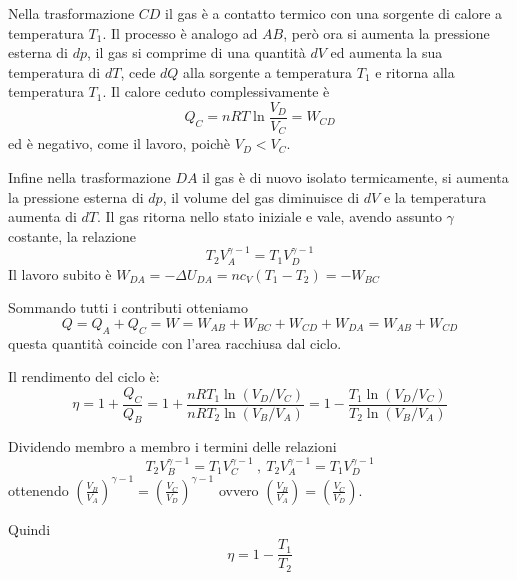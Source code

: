 \documentclass[class=book, crop=false, oneside, 12pt]{standalone}
\begin{document}
Nella trasformazione \(C D\) il gas è a contatto termico con una sorgente di calore a temperatura \(T_1\). 
Il processo è analogo ad \(A B\), però ora si aumenta la pressione esterna di \(d p\), il gas si comprime di una quantità \(d V\) ed aumenta la sua temperatura di \(d T\), cede \(d Q\) alla sorgente a temperatura \(T_1\) e ritorna alla temperatura \(T_1\). 
Il calore ceduto complessivamente è 
\begin{equation*}
    Q_C = n R T \ln \frac{V_D}{V_C} = W_{CD}
\end{equation*}
ed è negativo, come il lavoro, poichè \(V_D < V_C\).

Infine nella trasformazione \(D A\) il gas è di nuovo isolato termicamente, si aumenta la pressione esterna di \(d p\), il volume del gas diminuisce di \(d V\) e  la temperatura aumenta di \(d T\). 
Il gas ritorna nello stato iniziale e vale, avendo assunto \(\gamma\) costante, la relazione
\begin{equation*}
    T_2 V_A^{\gamma - 1} = T_1 V_D^{\gamma - 1}
\end{equation*}
Il lavoro subito è \(W_{DA} = -\Delta U_{DA} = n c_V \left(T_1 - T_2\right) = - W_{BC}\)

Sommando tutti i contributi otteniamo
\begin{equation*}
    Q = Q_A + Q_C = W = W_{AB} + W_{BC} + W_{CD} + W_{DA} = W_{AB} + W_{CD}
\end{equation*}
questa quantità coincide con l'area racchiusa dal ciclo.

Il rendimento del ciclo è:
\begin{equation*}
    \eta = 1 + \frac{Q_C}{Q_B} = 1 + \frac{n R T_1 \ln \left(V_D / V_C \right) }{n R T_2 \ln \left(V_B / V_A \right)} = 1 - \frac{T_1 \ln \left(V_D / V_C \right) }{T_2 \ln \left(V_B / V_A \right)}
\end{equation*}

Dividendo membro a membro i termini delle relazioni
\begin{equation*}
    T_2 V_B^{\gamma - 1} = T_1 V_C^{\gamma - 1} \ , \ T_2 V_A^{\gamma - 1} = T_1 V_D^{\gamma - 1} 
\end{equation*}
ottenendo \(\left(\frac{V_B}{V_A}\right)^{\gamma - 1} = \left(\frac{V_C}{V_D}\right)^{\gamma - 1}\) ovvero \(\left(\frac{V_B}{V_A}\right) = \left(\frac{V_C}{V_D}\right)\).

Quindi
\begin{equation}
    \eta = 1 - \frac{T_1}{T_2}
\end{equation}
\end{document}
